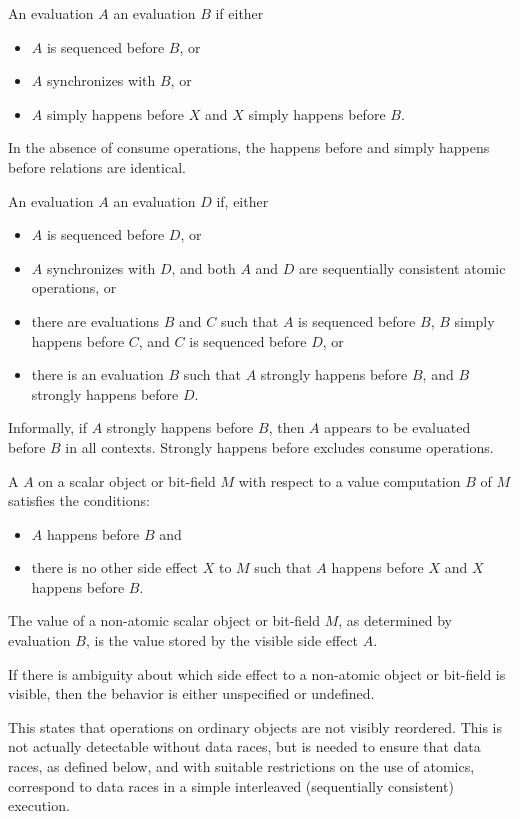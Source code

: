 \pnum
An evaluation $A$  an evaluation $B$
if either
\begin{itemize}
\item $A$ is sequenced before $B$, or
\item $A$ synchronizes with $B$, or
\item $A$ simply happens before $X$ and
$X$ simply happens before $B$.
\end{itemize}
\begin{note}
In the absence of consume operations,
the happens before and simply happens before relations are identical.
\end{note}

\pnum
An evaluation $A$ 
an evaluation $D$ if, either
\begin{itemize}
\item $A$ is sequenced before $D$, or
\item $A$ synchronizes with $D$, and
both $A$ and $D$ are
sequentially consistent atomic operations, or
\item there are evaluations $B$ and $C$
such that $A$ is sequenced before $B$,
$B$ simply happens before $C$, and
$C$ is sequenced before $D$, or
\item there is an evaluation $B$ such that
$A$ strongly happens before $B$, and
$B$ strongly happens before $D$.
\end{itemize}
\begin{note}
Informally, if $A$ strongly happens before $B$,
then $A$ appears to be evaluated before $B$
in all contexts. Strongly happens before excludes consume operations.
\end{note}

\pnum
A  $A$ on a scalar object or bit-field $M$
with respect to a value computation $B$ of $M$ satisfies the
conditions:
\begin{itemize}
\item $A$ happens before $B$ and
\item there is no other
%
side effect $X$ to $M$ such that $A$
happens before $X$ and $X$ happens before $B$.
\end{itemize}

The value of a non-atomic scalar object or bit-field $M$, as determined by
evaluation $B$, is the value stored by the
%
visible side effect $A$.
\begin{note}
If there is ambiguity about which side effect to a
non-atomic object or bit-field is visible, then the behavior is either
unspecified or undefined.
\end{note}
\begin{note}
This states that operations on
ordinary objects are not visibly reordered. This is not actually detectable
without data races, but is needed to ensure that data races, as defined
below, and with suitable restrictions on the use of atomics, correspond to data
races in a simple interleaved (sequentially consistent) execution.
\end{note}

